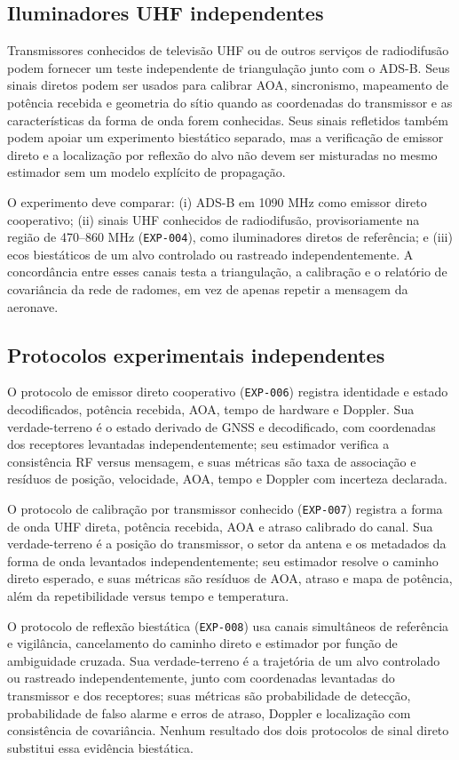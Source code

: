 \subsection*{Iluminadores UHF independentes}
Transmissores conhecidos de televisão UHF ou de outros serviços de radiodifusão podem fornecer um teste independente de triangulação junto com o ADS-B. Seus sinais diretos podem ser usados para calibrar AOA, sincronismo, mapeamento de potência recebida e geometria do sítio quando as coordenadas do transmissor e as características da forma de onda forem conhecidas. Seus sinais refletidos também podem apoiar um experimento biestático separado, mas a verificação de emissor direto e a localização por reflexão do alvo não devem ser misturadas no mesmo estimador sem um modelo explícito de propagação.

O experimento deve comparar: (i) ADS-B em 1090 MHz como emissor direto cooperativo; (ii) sinais UHF conhecidos de radiodifusão, provisoriamente na região de 470--860 MHz (\texttt{EXP-004}), como iluminadores diretos de referência; e (iii) ecos biestáticos de um alvo controlado ou rastreado independentemente. A concordância entre esses canais testa a triangulação, a calibração e o relatório de covariância da rede de radomes, em vez de apenas repetir a mensagem da aeronave.

\subsection*{Protocolos experimentais independentes}
O protocolo de emissor direto cooperativo (\texttt{EXP-006}) registra identidade e estado decodificados, potência recebida, AOA, tempo de hardware e Doppler. Sua verdade-terreno é o estado derivado de GNSS e decodificado, com coordenadas dos receptores levantadas independentemente; seu estimador verifica a consistência RF versus mensagem, e suas métricas são taxa de associação e resíduos de posição, velocidade, AOA, tempo e Doppler com incerteza declarada.

O protocolo de calibração por transmissor conhecido (\texttt{EXP-007}) registra a forma de onda UHF direta, potência recebida, AOA e atraso calibrado do canal. Sua verdade-terreno é a posição do transmissor, o setor da antena e os metadados da forma de onda levantados independentemente; seu estimador resolve o caminho direto esperado, e suas métricas são resíduos de AOA, atraso e mapa de potência, além da repetibilidade versus tempo e temperatura.

O protocolo de reflexão biestática (\texttt{EXP-008}) usa canais simultâneos de referência e vigilância, cancelamento do caminho direto e estimador por função de ambiguidade cruzada. Sua verdade-terreno é a trajetória de um alvo controlado ou rastreado independentemente, junto com coordenadas levantadas do transmissor e dos receptores; suas métricas são probabilidade de detecção, probabilidade de falso alarme e erros de atraso, Doppler e localização com consistência de covariância. Nenhum resultado dos dois protocolos de sinal direto substitui essa evidência biestática.

